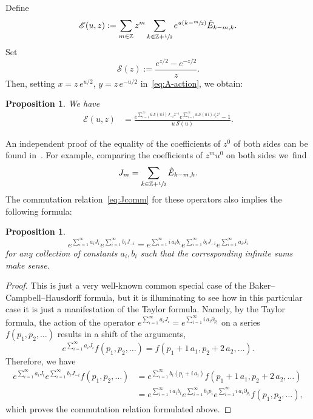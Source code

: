 \documentclass[JEP,XML,SOM,Unicode,NoEqCountersInSection,NoFloatCountersInSection]{cedram}
\let\mathcal\mathscr
\theoremstyle{plain}
\newtheorem{proposition}[theorem]{Proposition}
\theoremstyle{definition}
\theoremstyle{remark}
\newcommand{\Z}{\mathbb{Z}}
\newcommand{\cS}{\mathcal{S}}
\newcommand{\cE}{\mathcal{E}}
\begin{document}
Define
\begin{equation}\label{eq:cEdef}
\cE(u,z):=\sum_{m\in\Z}z^m \sum_{k\in\Z+\sfrac{1}{2}}
e^{u(k-\sfrac{m}{2})} \hat{E}_{k-m,k}.
\end{equation}
Set
\begin{equation}\label{eq:Sdef}
\mathcal{S}(z):= \dfrac{e^{z/2}-e^{-z/2}}{z}.
\end{equation}
Then, setting $x=z\,e^{u/2}$, $y=z\,e^{-u/2}$ in~\eqref{eq:A-action}, we obtain:

\begin{proposition} We have
\begin{align}\label{eq:cEform}
\cE(u,z)
&=\frac{
e^{\sum_{i=1}^\infty u\,\cS(u\,i) J_{-i}z^{-i}}
e^{\sum_{i=1}^\infty u\,\cS(u\,i) J_{i}z^{i}} -1 }
{u\,\cS(u)}.
\end{align}
\end{proposition}

An independent proof of the equality of the coefficients of $z^0$ of both sides can be found in~\cite{SSZ12}.
For example, comparing the coefficients of $z^mu^0$ on both sides we~find
\begin{equation*}
J_m=\sum_{k\in\Z+\sfrac{1}{2}}\hat E_{k-m,k}.
\end{equation*}
The commutation relation~\eqref{eq:Jcomm} for these operators also implies the following formula:

\skpt
\begin{proposition}\mbox{}\vspace*{-1.2\baselineskip}
\begin{equation}\label{eq:expJcomm}
e^{\sum_{i=1}^\infty a_i J_i}
e^{\sum_{i=1}^\infty b_i J_{-i}}=
e^{\sum_{i=1}^\infty i \,a_ib_i}
e^{\sum_{i=1}^\infty b_i J_{-i}}
e^{\sum_{i=1}^\infty a_i J_i}
\end{equation}
for any collection of constants $a_i,b_i$ such that the corresponding infinite sums make sense.
\end{proposition}

\begin{proof}
This is just a very well-known common special case of the Baker--Campbell--Hausdorff formula, but it is illuminating to see how in this particular case it is just a manifestation of the Taylor formula. Namely, by the Taylor formula, the action of the operator $e^{\sum_{i=1}^\infty a_i J_i}=e^{\sum_{i=1}^\infty i\,a_i \partial_{p_i}}$ on a series $f(p_1,p_2,\dots)$ results in a shift of the arguments,
\begin{equation*}
e^{\sum_{i=1}^\infty a_i J_i}f(p_1,p_2,\dots)
=f(p_1+1\,a_1,p_2+2\,a_2,\dots).
\end{equation*}
Therefore, we have
\begin{align*}
e^{\sum_{i=1}^\infty a_i J_i}
e^{\sum_{i=1}^\infty b_i J_{-i}}f(p_1,p_2,\dots)&=
e^{\sum_{i=1}^\infty b_i (p_i+i\,a_i)}
f(p_1+1\,a_1,p_2+2\,a_2,\dots)
\\ &
=e^{\sum_{i=1}^\infty i\,a_ib_i}
e^{\sum_{i=1}^\infty b_i p_i}
e^{\sum_{i=1}^\infty i\,a_i \partial_{p_i}}f(p_1,p_2,\dots),
\end{align*}
which proves the commutation relation formulated above.
\end{proof}
\end{document}
